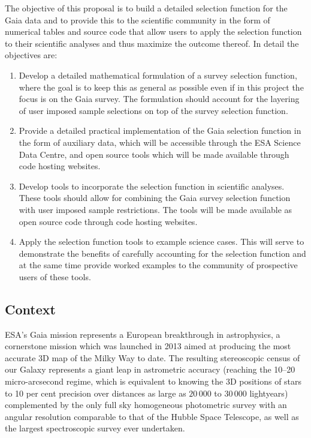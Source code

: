 The objective of this proposal is to build a detailed selection function for the Gaia data and to provide this to the
scientific community in the form of numerical tables and source code that allow users to apply the selection function to
their scientific analyses and thus maximize the outcome thereof. In detail the objectives are:

\begin{enumerate}
    \item Develop a detailed mathematical formulation of a survey selection function, where the goal is to keep this
        as general as possible even if in this project the focus is on the Gaia survey. The formulation should account
        for the layering of user imposed sample selections on top of the survey selection function.
    \item Provide a detailed practical implementation of the Gaia selection function in the form of auxiliary data,
        which will be accessible through the ESA Science Data Centre, and open source tools which will be made available through
        code hosting websites. 
    \item Develop tools to incorporate the selection function in scientific analyses. These tools should allow for
        combining the Gaia survey selection function with user imposed sample restrictions. The tools will be made
        available as open source code through code hosting websites.
    \item Apply the selection function tools to example science cases. This will serve to demonstrate the benefits of
        carefully accounting for the selection function and at the same time provide worked examples to the community of
        prospective users of these tools.
\end{enumerate}

\subsection{Context}
\label{sec:context}

ESA's Gaia mission \cite{2016A&A...595A...1G} represents a European breakthrough in astrophysics, a cornerstone
mission which was launched in 2013 aimed at producing the most accurate 3D map of the Milky Way to date. The resulting
stereoscopic census of our Galaxy represents a giant leap in astrometric accuracy (reaching the 10--20 micro-arcsecond
regime, which is equivalent to knowing the 3D positions of stars to 10 per cent precision over distances as large as $20\,000$ to $30\,000$ lightyears) complemented by the only full sky homogeneous photometric survey with an angular resolution comparable to that
of the Hubble Space Telescope, as well as the largest spectroscopic survey ever undertaken. 

